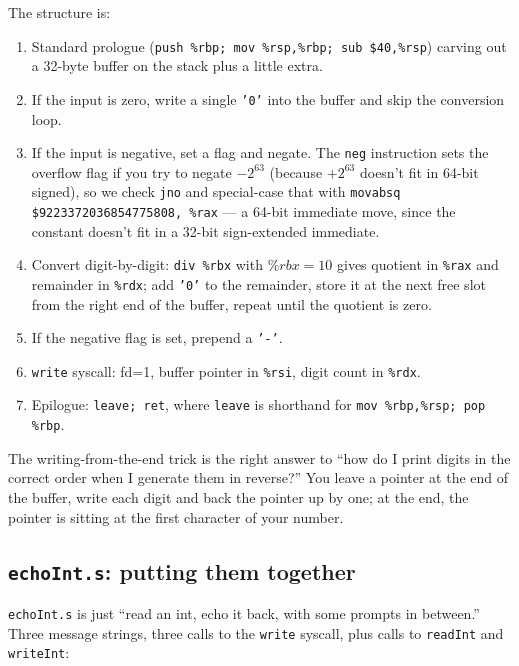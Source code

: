 \documentclass[11pt]{article}
\begin{document}
The structure is:
\begin{enumerate}
  \item Standard prologue (\texttt{push \%rbp; mov \%rsp,\%rbp; sub
    \$40,\%rsp}) carving out a 32-byte buffer on the stack plus a
    little extra.
  \item If the input is zero, write a single \texttt{'0'} into the
    buffer and skip the conversion loop.
  \item If the input is negative, set a flag and negate. The
    \texttt{neg} instruction sets the overflow flag if you try to
    negate $-2^{63}$ (because $+2^{63}$ doesn't fit in 64-bit signed),
    so we check \texttt{jno} and special-case that with
    \texttt{movabsq \$9223372036854775808, \%rax} --- a 64-bit
    immediate move, since the constant doesn't fit in a 32-bit
    sign-extended immediate.
  \item Convert digit-by-digit: \texttt{div \%rbx} with $\%rbx = 10$
    gives quotient in \texttt{\%rax} and remainder in \texttt{\%rdx};
    add \texttt{'0'} to the remainder, store it at the next free
    slot from the right end of the buffer, repeat until the quotient
    is zero.
  \item If the negative flag is set, prepend a \texttt{'-'}.
  \item \texttt{write} syscall: fd=1, buffer pointer in \texttt{\%rsi},
    digit count in \texttt{\%rdx}.
  \item Epilogue: \texttt{leave; ret}, where \texttt{leave} is
    shorthand for \texttt{mov \%rbp,\%rsp; pop \%rbp}.
\end{enumerate}

The writing-from-the-end trick is the right answer to ``how do I
print digits in the correct order when I generate them in reverse?''
You leave a pointer at the end of the buffer, write each digit and
back the pointer up by one; at the end, the pointer is sitting at the
first character of your number.

\subsection*{\texttt{echoInt.s}: putting them together}

\texttt{echoInt.s} is just ``read an int, echo it back, with some
prompts in between.'' Three message strings, three calls to the
\texttt{write} syscall, plus calls to \texttt{readInt} and
\texttt{writeInt}:
\end{document}
